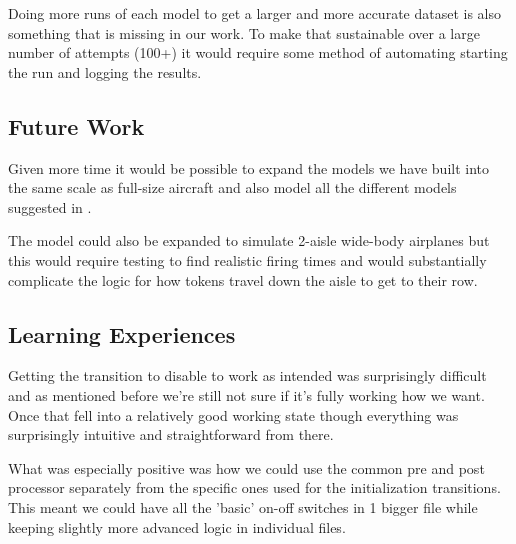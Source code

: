 \documentclass[english]{article}
\begin{document}
Doing more runs of each model to get a larger and more accurate dataset is also something that is missing in our work. To make that sustainable over a large number of attempts (100+) it would require some method of automating starting the run and logging the results.

\subsection{Future Work}
Given more time it would be possible to expand the models we have built into the same scale as full-size aircraft and also model all the different models suggested in . 

The model could also be expanded to simulate 2-aisle wide-body airplanes but this would require testing to find realistic firing times and would substantially complicate the logic for how tokens travel down the aisle to get to their row. 

\subsection{Learning Experiences}
Getting the transition to disable to work as intended was surprisingly difficult and as mentioned before we're still not sure if it's fully working how we want. Once that fell into a relatively good working state though everything was surprisingly intuitive and straightforward from there. 

What was especially positive was how we could use the common pre and post processor separately from the specific ones used for the initialization transitions. This meant we could have all the 'basic' on-off switches in 1 bigger file while keeping slightly more advanced logic in individual files.




\newpage
\printbibliography
\end{document}
